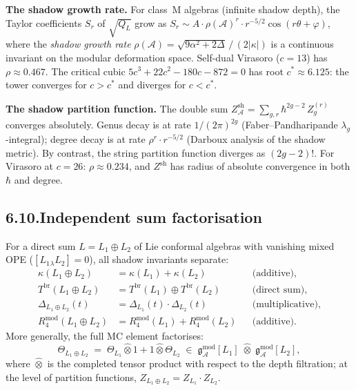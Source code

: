\documentclass[11pt]{report}
\theoremstyle{definition}
\theoremstyle{remark}
\providecommand{\cA}{\mathcal{A}}
\providecommand{\gAmod}{\mathfrak{g}^{\mathrm{mod}}_\cA}
\numberwithin{equation}{section}
\begin{document}
\medskip

\noindent\textbf{The shadow growth rate.}\enspace
For class~M algebras (infinite shadow depth), the Taylor
coefficients $S_r$ of $\sqrt{Q_L}$ grow as
$S_r \sim A\cdot\rho(\cA)^r\cdot r^{-5/2}\cos(r\theta+\varphi)$,
where the \emph{shadow growth rate}
$\rho(\cA) = \sqrt{9\alpha^2+2\Delta}\,/\,(2|\kappa|)$
is a continuous invariant on the modular deformation space.
Self-dual Virasoro ($c=13$) has $\rho\approx 0.467$.
The critical cubic $5c^3+22c^2-180c-872=0$ has root
$c^*\approx 6.125$: the tower converges for $c>c^*$ and
diverges for $c<c^*$.

\medskip
\noindent\textbf{The shadow partition function.}\enspace
The double sum $Z^{\mathrm{sh}}_\cA =
\sum_{g,r} \hbar^{2g-2}\,Z_g^{(r)}$ converges absolutely.
Genus decay is at rate $1/(2\pi)^{2g}$
(Faber--Pandharipande $\lambda_g$-integral); degree decay is at
rate $\rho^r \cdot r^{-5/2}$ (Darboux analysis of the shadow
metric). By contrast, the string partition function
diverges as $(2g{-}2)!$. For Virasoro at $c=26$:
$\rho\approx 0.234$, and $Z^{\mathrm{sh}}$ has radius of
absolute convergence in both $\hbar$ and degree.

\subsection*{6.10.\enspace Independent sum factorisation}

For a direct sum $L=L_1\oplus L_2$ of Lie conformal algebras with
vanishing mixed OPE ($[L_1{}_\lambda L_2]=0$), all shadow invariants
separate:
\begin{align*}
\kappa(L_1\oplus L_2)
&=\kappa(L_1)+\kappa(L_2)
&&\text{(additive)},\\[3pt]
T^{\mathrm{br}}(L_1\oplus L_2)
&=T^{\mathrm{br}}(L_1)\oplus T^{\mathrm{br}}(L_2)
&&\text{(direct sum)},\\[3pt]
\Delta_{L_1\oplus L_2}(t)
&=\Delta_{L_1}(t)\cdot\Delta_{L_2}(t)
&&\text{(multiplicative)},\\[3pt]
R_4^{\mathrm{mod}}(L_1\oplus L_2)
&=R_4^{\mathrm{mod}}(L_1)+R_4^{\mathrm{mod}}(L_2)
&&\text{(additive)}.
\end{align*}
More generally, the full MC element factorises:
\[
\Theta_{L_1\oplus L_2}
\;=\;
\Theta_{L_1}\hat\otimes 1+1\hat\otimes\Theta_{L_2}
\;\in\;
\gAmod[L_1]\;\hat\otimes\;\gAmod[L_2],
\]
where $\hat\otimes$ is the completed tensor product with respect to
the depth filtration; at the level of partition functions,
$Z_{L_1\oplus L_2}=Z_{L_1}\cdot Z_{L_2}$.
\end{document}
